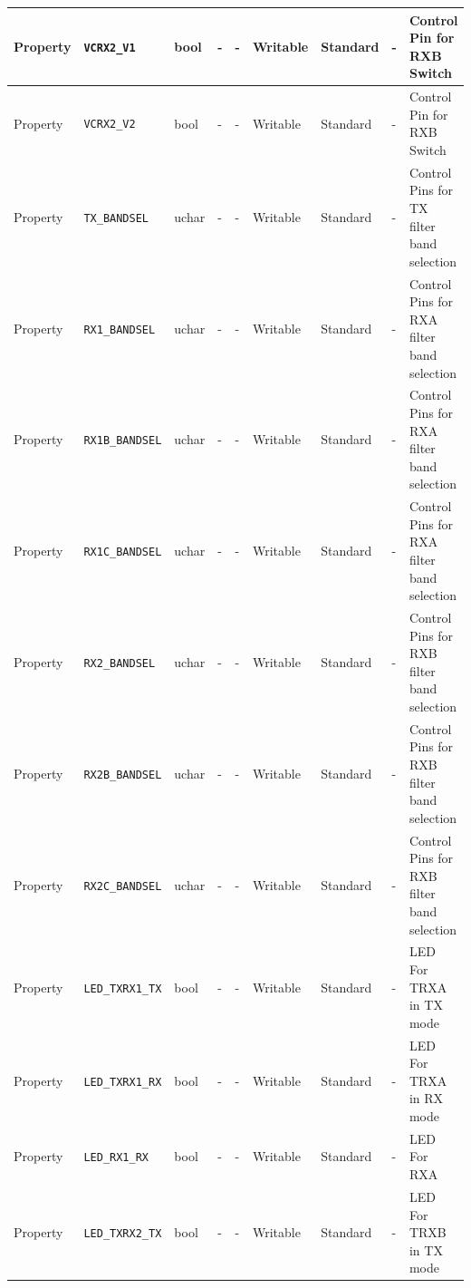 \documentclass{article}
\begin{document}
\begin{landscape}
\begin{scriptsize}
\begin{tabular}{|p{2cm}|p{2.5cm}|p{1cm}|p{2cm}|p{2cm}|p{1.75cm}|p{2cm}|p{2cm}|p{5.29cm}|}
			\hline
			Property     & \verb+VCRX2_V1+      & bool  & -              & -               & Writable      & Standard    & -       & Control Pin for RXB Switch   \\
			\hline
			Property     & \verb+VCRX2_V2+      & bool  & -              & -               & Writable      & Standard    & -       & Control Pin for RXB Switch   \\
			\hline
			Property     & \verb+TX_BANDSEL+    & uchar & -              & -               & Writable      & Standard    & -       & Control Pins for TX filter band selection   \\
			\hline
			Property     & \verb+RX1_BANDSEL+   & uchar & -              & -               & Writable      & Standard    & -       & Control Pins for RXA filter band selection   \\
			\hline
			Property     & \verb+RX1B_BANDSEL+  & uchar & -              & -               & Writable      & Standard    & -       & Control Pins for RXA filter band selection   \\
			\hline
			Property     & \verb+RX1C_BANDSEL+  & uchar & -              & -               & Writable      & Standard    & -       & Control Pins for RXA filter band selection   \\
			\hline
			Property     & \verb+RX2_BANDSEL+   & uchar & -              & -               & Writable      & Standard    & -       & Control Pins for RXB filter band selection   \\
			\hline
			Property     & \verb+RX2B_BANDSEL+  & uchar & -              & -               & Writable      & Standard    & -       & Control Pins for RXB filter band selection   \\
			\hline
			Property     & \verb+RX2C_BANDSEL+  & uchar & -              & -               & Writable      & Standard    & -       & Control Pins for RXB filter band selection   \\
			\hline
			Property     & \verb+LED_TXRX1_TX+  & bool  & -              & -               & Writable      & Standard    & -       & LED For TRXA in TX mode   \\
			\hline
			Property     & \verb+LED_TXRX1_RX+  & bool  & -              & -               & Writable      & Standard    & -       & LED For TRXA in RX mode   \\
			\hline
			Property     & \verb+LED_RX1_RX+    & bool  & -              & -               & Writable      & Standard    & -       & LED For RXA \\
			\hline
			Property     & \verb+LED_TXRX2_TX+  & bool  & -              & -               & Writable      & Standard    & -       & LED For TRXB in TX mode   \\

\end{tabular}
\end{scriptsize}
\end{landscape}
\end{document}
